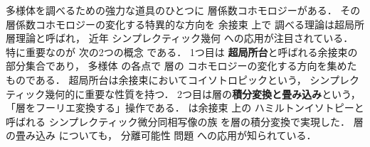 \documentclass[11pt,a4paper,uplatex,dvipdfmx]{ujarticle} 		%
\newcommand{\研究課題名}{打切り超局所台を用いた層のフーリエ変換の研究とシンプレクティック幾何への応用}
\newcommand{\研究機関名}{北海道大学}
\newcommand{\研究代表者氏名}{大柴寿浩}
\begin{document}
多様体を調べるための強力な道具のひとつに
層係数コホモロジーがある．
その層係数コホモロジーの変化する特異的な方向を
余接束
上で
調べる理論は超局所層理論と呼ばれ，
近年
シンプレクティック幾何
への応用が注目されている．
特に重要なのが
次の2つの概念
である．
1つ目は
\textbf{超局所台}と呼ばれる余接束の部分集合であり，
多様体
の各点で
層の
コホモロジーの変化する方向を集めたものである．
超局所台は余接束においてコイソトロピックという，
シンプレクティック幾何的に重要な性質を持つ．
2つ目は層の\textbf{積分変換と畳み込み}という，
「層をフーリエ変換する」操作である．
\cite{GKS12}は余接束
上の
ハミルトンイソトピーと呼ばれる
シンプレクティック微分同相写像の族
を層の積分変換で実現した．
層の畳み込み
についても，
分離可能性
問題
への応用が知られている\cite{AI20}．
\end{document}
